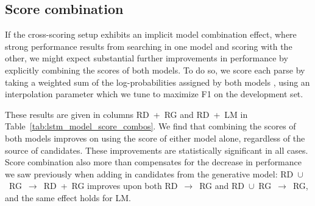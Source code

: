 \documentclass[11pt,a4paper]{article}
\newcommand{\p}{\ensuremath{\rightarrow}\xspace}
\newcommand{\un}{\ensuremath{\cup}\xspace}
\begin{document}
\subsection{Score combination} 
\label{sec:score_combination}
If the cross-scoring setup exhibits an implicit model combination effect, where strong performance results from searching in one model and scoring with the other, we might expect substantial further improvements in performance by explicitly combining the scores of both models. To do so, we score each parse by taking a weighted sum of the log-probabilities assigned by both models \cite{hayashi2013efficient}, using an interpolation parameter which we tune to maximize F1 on the development set. 

These results are given in columns \mbox{RD + RG} and \mbox{RD + LM} in Table~\ref{tab:lstm_model_score_combos}. 
We find that combining the scores of both models improves on using the score of either model alone, regardless of the source of candidates. These improvements are statistically significant in all cases. Score combination also more than compensates for the decrease in performance we saw previously when adding in candidates from the generative model: \mbox{RD \un RG \p RD + RG} improves upon both \mbox{RD \p RG} and \mbox{RD \un RG \p RG}, and the same effect holds for LM. 
\end{document}
